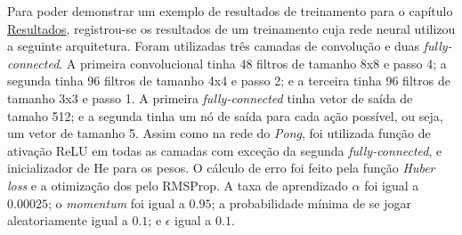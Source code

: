 Para poder demonstrar um exemplo de resultados de treinamento para o capítulo \hyperref[cap:resultados]{Resultados}, registrou-se os resultados de um treinamento cuja rede neural utilizou a seguinte arquitetura.
Foram utilizadas três camadas de convolução e duas \textit{fully-connected}.
A primeira convolucional tinha 48 filtros de tamanho 8x8 e passo 4; a segunda tinha 96 filtros de tamanho 4x4 e passo 2; e a terceira tinha 96 filtros de tamanho 3x3 e passo 1.
A primeira \textit{fully-connected} tinha vetor de saída de tamaho 512; e a segunda tinha um nó de saída para cada ação possível, ou seja, um vetor de tamanho 5.
Assim como na rede do \textit{Pong}, foi utilizada função de ativação ReLU em todas as camadas com exceção da segunda \textit{fully-connected}, e inicializador de He para os pesos.
O cálculo de erro foi feito pela função \textit{Huber loss} e a otimização dos pelo RMSProp.
A taxa de aprendizado $\alpha$ foi igual a $0.00025$; o \textit{momentum} foi igual a $0.95$; a probabilidade mínima de se jogar aleatoriamente igual a $0.1$; e $\epsilon$ igual a $0.1$.


